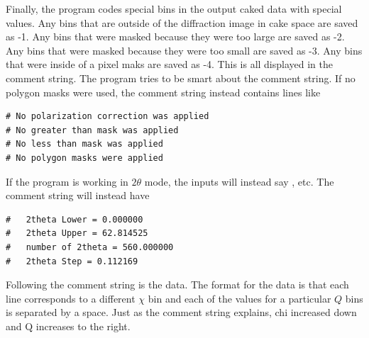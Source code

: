 Finally, the program codes special bins in the output caked data
with special values. Any bins that are outside of the diffraction
image in cake space are saved as -1. Any bins that were masked
because they were too large are saved as -2. Any bins that
were masked because they were too small are saved as -3. Any bins 
that were inside of a pixel maks are saved as -4. This is all
displayed in the comment string. The program tries to be smart about
the comment string. If no polygon masks were used, the comment string
instead contains lines like
\begin{lstlisting}[caption={'Alternate Header'}]
# No polarization correction was applied
# No greater than mask was applied
# No less than mask was applied
# No polygon masks were applied
\end{lstlisting}
If the program is working in $2\theta$ mode, the inputs will instead 
say , etc. The comment string will instead have
\begin{lstlisting}[caption={'Another Alternate Header'}]
#   2theta Lower = 0.000000
#   2theta Upper = 62.814525
#   number of 2theta = 560.000000
#   2theta Step = 0.112169
\end{lstlisting}
Following the comment string is the data. The format for the data is
that each line corresponds to a different $\chi$ bin and each of the 
values for a particular $Q$ bins is separated by a space. Just
as the comment string explains, chi increased down and Q increases to 
the right. 



